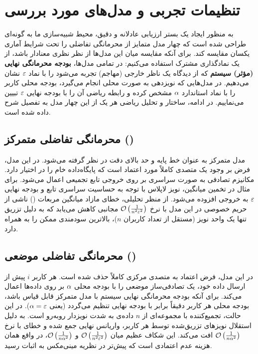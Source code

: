 \section{تنظیمات تجربی و مدل‌های مورد بررسی}
\label{sec:sim-setup}

به منظور ایجاد یک بستر ارزیابی عادلانه و دقیق، محیط شبیه‌سازی ما به گونه‌ای طراحی شده است که چهار مدل متمایز از محرمانگی تفاضلی را تحت شرایط آماری یکسان مقایسه کند. برای آنکه مقایسه میان این مدل‌ها از نظر نظری معنادار باشد، از یک نمادگذاری مشترک استفاده می‌کنیم: در تمامی مدل‌ها، \textbf{بودجه محرمانگی نهایی (مؤثر) سیستم} که از دیدگاه یک ناظر خارجی (مهاجم) تجربه می‌شود را با نماد $\varepsilon$ نشان می‌دهیم. در مدل‌هایی که نویزدهی به صورت محلی انجام می‌گیرد، بودجه محلی کاربر را با نماد استاندارد $\alpha$ مشخص کرده و رابطه ریاضی آن را با بودجه نهایی $\varepsilon$ تبیین می‌نماییم. در ادامه، ساختار و تحلیل ریاضی هر یک از این چهار مدل به تفصیل شرح داده شده است.

\subsection{محرمانگی تفاضلی متمرکز ()}
مدل متمرکز به عنوان خط پایه و حد بالای دقت در نظر گرفته می‌شود. در این مدل، فرض بر وجود یک متصدی کاملاً مورد اعتماد است که پایگاه‌داده خام \Dset را در اختیار دارد. مکانیزم تصادفی \mech به صورت سراسری بر روی خروجی تابع تجمیعی اعمال می‌شود.
برای مثال در تخمین میانگین، نویز لاپلاس با توجه به حساسیت سراسری تابع و بودجه نهایی $\varepsilon$ به خروجی افزوده می‌شود. از منظر تحلیلی، خطای مازاد میانگین مربعات () ناشی از حریم خصوصی در این مدل با نرخ $\mathcal{O}\left( \frac{1}{n^2 \varepsilon^2} \right)$ مجانبی کاهش می‌یابد که به دلیل تزریق تنها یک واحد نویز (مستقل از تعداد کاربران $n$)، بالاترین سودمندی ممکن را به همراه دارد.

\subsection{محرمانگی تفاضلی موضعی ()}
در این مدل، فرض اعتماد به متصدی مرکزی کاملاً حذف شده است. هر کاربر $i$ پیش از ارسال داده خود، یک تصادفی‌ساز موضعی را با بودجه محلی $\alpha$ بر روی داده‌ها اعمال می‌کند. برای آنکه بودجه محرمانگی نهایی سیستم با مدل متمرکز قابل قیاس باشد، بودجه محلی هر کاربر دقیقاً برابر با بودجه نهایی تنظیم می‌گردد (یعنی $\alpha = \varepsilon$).
در این حالت، تجمیع‌کننده با مجموعه‌ای از $n$ داده‌ی به شدت نویزدار روبه‌رو است. به دلیل استقلال نویزهای تزریق‌شده توسط هر کاربر، واریانس نهایی جمع شده و خطای  با نرخ $\mathcal{O}\left( \frac{1}{n \alpha^2} \right)$ افت می‌کند. این شکاف عظیم میان $\mathcal{O}\left( \frac{1}{n^2 \varepsilon^2} \right)$ و $\mathcal{O}\left( \frac{1}{n \alpha^2} \right)$، در واقع همان هزینه عدم اعتمادی است که پیش‌تر در نظریه مینی‌مکس به اثبات رسید.

